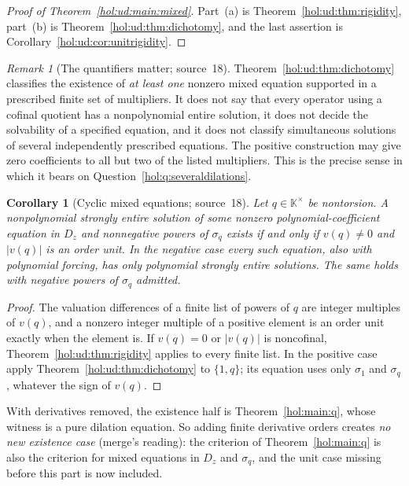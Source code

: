 \documentclass[11pt]{article}
\numberwithin{equation}{section}
\newtheorem{corollary}[theorem]{Corollary}
\theoremstyle{definition}
\theoremstyle{remark}
\newtheorem{remark}[theorem]{Remark}
\newcommand{\abs}[1]{\lvert#1\rvert}
\newcommand{\KK}{\mathbb K}
\begin{document}
\begin{proof}[Proof of Theorem~\ref{hol:ud:main:mixed}]
Part~(a) is Theorem~\ref{hol:ud:thm:rigidity}, part~(b) is
Theorem~\ref{hol:ud:thm:dichotomy}, and the last assertion is
Corollary~\ref{hol:ud:cor:unitrigidity}.
\end{proof}

\begin{remark}[The quantifiers matter; source~18]\label{hol:ud:rem:quantifiers}
Theorem~\ref{hol:ud:thm:dichotomy} classifies the existence of \emph{at least
one} nonzero mixed equation supported in a prescribed finite set of
multipliers. It does not say that every operator using a cofinal quotient has
a nonpolynomial entire solution, it does not decide the solvability of a
specified equation, and it does not classify simultaneous solutions of
several independently prescribed equations. The positive construction may
give zero coefficients to all but two of the listed multipliers. This is the
precise sense in which it bears on Question~\ref{hol:q:severaldilations}.
\end{remark}

\begin{corollary}[Cyclic mixed equations; source~18]\label{hol:ud:cor:cyclic}
Let $q\in\KK^\times$ be nontorsion. A nonpolynomial strongly entire solution
of some nonzero polynomial-coefficient equation in $D_z$ and nonnegative
powers of $\sigma_q$ exists if and only if $v(q)\ne0$ and $\abs{v(q)}$ is an
order unit. In the negative case every such equation, also with polynomial
forcing, has only polynomial strongly entire solutions. The same holds with
negative powers of $\sigma_q$ admitted.
\end{corollary}

\begin{proof}
The valuation differences of a finite list of powers of $q$ are integer
multiples of $v(q)$, and a nonzero integer multiple of a positive element is
an order unit exactly when the element is. If $v(q)=0$ or $\abs{v(q)}$ is
noncofinal, Theorem~\ref{hol:ud:thm:rigidity} applies to every finite list.
In the positive case apply Theorem~\ref{hol:ud:thm:dichotomy} to $\{1,q\}$;
its equation uses only $\sigma_1$ and $\sigma_q$, whatever the sign of $v(q)$.
\end{proof}

With derivatives removed, the existence half is Theorem~\ref{hol:main:q},
whose witness is a pure dilation equation. So adding finite derivative orders
creates \emph{no new existence case} (merge's reading): the criterion of
Theorem~\ref{hol:main:q} is also the criterion for mixed equations in $D_z$
and $\sigma_q$, and the unit case missing before this part is now included.
\end{document}
